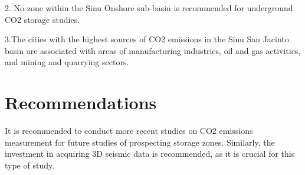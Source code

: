 \documentclass{ifacconf}
\begin{document}
2. No zone within the Sinu Onshore sub-basin is recommended for underground CO2 storage studies.

3.The cities with the highest sources of CO2 emissions in the Sinu San Jacinto basin are associated with areas of manufacturing industries, oil and gas activities, and mining and quarrying sectors.

\section{Recommendations}
It is recommended to conduct more recent studies on CO2 emissions measurement for future studies of prospecting storage zones. Similarly, the investment in acquiring 3D seismic data is recommended, as it is crucial for this type of study.


                                                   






                     
\end{document}

